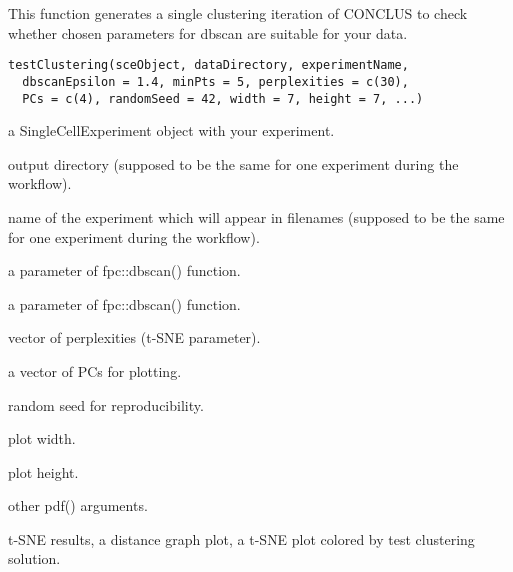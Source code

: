 \documentclass[a4paper]{book}
\begin{document}
%
\begin{Description}\relax
This function generates a single clustering iteration of CONCLUS to check whether
chosen parameters for dbscan are suitable for your data.
\end{Description}
%
\begin{Usage}
\begin{verbatim}
testClustering(sceObject, dataDirectory, experimentName,
  dbscanEpsilon = 1.4, minPts = 5, perplexities = c(30),
  PCs = c(4), randomSeed = 42, width = 7, height = 7, ...)
\end{verbatim}
\end{Usage}
%
\begin{Arguments}
\begin{ldescription}
\item[\code{sceObject}] a SingleCellExperiment object with your experiment.

\item[\code{dataDirectory}] output directory (supposed to be the same for one experiment during the workflow).

\item[\code{experimentName}] name of the experiment which will appear in filenames (supposed to be the same for one experiment during the workflow).

\item[\code{dbscanEpsilon}] a parameter of fpc::dbscan() function.

\item[\code{minPts}] a parameter of fpc::dbscan() function.

\item[\code{perplexities}] vector of perplexities (t-SNE parameter).

\item[\code{PCs}] a vector of PCs for plotting.

\item[\code{randomSeed}] random seed for reproducibility.

\item[\code{width}] plot width.

\item[\code{height}] plot height.

\item[\code{...}] other pdf() arguments.
\end{ldescription}
\end{Arguments}
%
\begin{Value}
t-SNE results, a distance graph plot, a t-SNE plot colored by test clustering solution.
\end{Value}
\printindex{}
\end{document}
